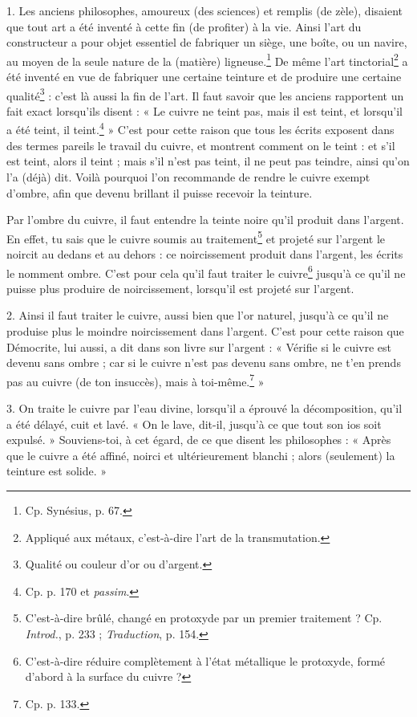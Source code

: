 \documentclass[a4paper, 11pt, oneside, polutonikogreek, french]{article}
\begin{document}
1. Les anciens philosophes, amoureux (des sciences) et remplis (de zèle), disaient que tout art a été inventé à cette fin (de profiter) à la vie. Ainsi l'art du constructeur a pour objet essentiel de fabriquer un siège, une boîte, ou un navire, au moyen de la seule nature de la (matière) ligneuse.\footnote{Cp. Synésius, p. 67.} De même l'art tinctorial\footnote{Appliqué aux métaux, c'est-à-dire l'art de la transmutation.} a été inventé en vue de fabriquer une certaine teinture et de produire une certaine qualité\footnote{Qualité ou couleur d'or ou d'argent.} : c'est là aussi la fin de l'art. Il faut savoir que les anciens rapportent un fait exact lorsqu'ils disent : « Le cuivre ne teint pas, mais il est teint, et lorsqu'il a été teint, il teint.\footnote{Cp. p. 170 et \emph{passim}.} » C'est pour cette raison que tous les écrits exposent dans des termes pareils le travail du cuivre, et montrent comment on le teint : et s'il est teint, alors il teint ; mais s'il n'est pas teint, il ne peut pas teindre, ainsi qu'on l'a (déjà) dit. Voilà pourquoi l'on recommande de rendre le cuivre exempt d'ombre, afin que devenu brillant il puisse recevoir la teinture.

Par l'ombre du cuivre, il faut entendre la teinte noire qu'il produit dans l'argent. En effet, tu sais que le cuivre soumis au traitement\footnote{C'est-à-dire brûlé, changé en protoxyde par un premier traitement ? Cp. \emph{Introd.}, p. 233 ; \emph{Traduction}, p. 154.} et projeté sur l'argent le noircit au dedans et au dehors : ce noircissement produit dans l'argent, les écrits le nomment ombre. C'est pour cela qu'il faut traiter le cuivre\footnote{C'est-à-dire réduire complètement à l'état métallique le protoxyde, formé d'abord à la surface du cuivre ?} jusqu'à ce qu'il ne puisse plus produire de noircissement, lorsqu'il est projeté sur l'argent.

2. Ainsi il faut traiter le cuivre, aussi bien que l'or naturel, jusqu'à ce qu'il ne produise plus le moindre noircissement dans l'argent. C'est pour cette raison que Démocrite, lui aussi, a dit dans son livre sur l'argent : « Vérifie si le cuivre est devenu sans ombre ; car si le cuivre n'est pas devenu sans ombre, ne t'en prends pas au cuivre (de ton insuccès), mais à toi-même.\footnote{Cp. p. 133.} »

3. On traite le cuivre par l'eau divine, lorsqu'il a éprouvé la décomposition, qu'il a été délayé, cuit et lavé. « On le lave, dit-il, jusqu'à ce que tout son ios soit expulsé. » Souviens-toi, à cet égard, de ce que disent les philosophes : « Après que le cuivre a été affiné, noirci et ultérieurement blanchi ; alors (seulement) la teinture est solide. »
\end{document}
